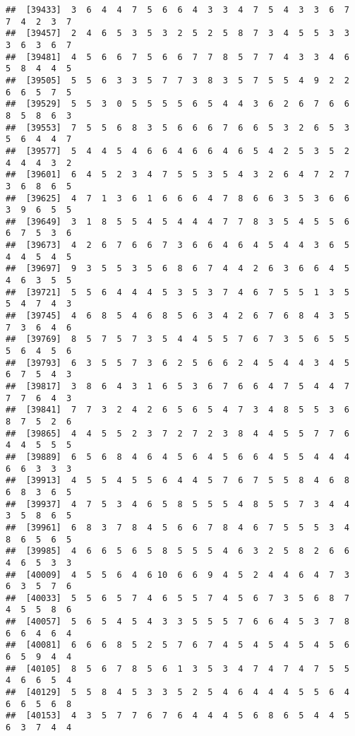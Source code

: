 \documentclass[
]{book}
\begin{document}
\begin{verbatim}
##  [39433]  3  6  4  4  7  5  6  6  4  3  3  4  7  5  4  3  3  6  7  7  4  2  3  7
##  [39457]  2  4  6  5  3  5  3  2  5  2  5  8  7  3  4  5  5  3  3  3  6  3  6  7
##  [39481]  4  5  6  6  7  5  6  6  7  7  8  5  7  7  4  3  3  4  6  5  8  4  4  5
##  [39505]  5  5  6  3  3  5  7  7  3  8  3  5  7  5  5  4  9  2  2  6  6  5  7  5
##  [39529]  5  5  3  0  5  5  5  5  6  5  4  4  3  6  2  6  7  6  6  8  5  8  6  3
##  [39553]  7  5  5  6  8  3  5  6  6  6  7  6  6  5  3  2  6  5  3  5  6  4  4  7
##  [39577]  5  4  4  5  4  6  6  4  6  6  4  6  5  4  2  5  3  5  2  4  4  4  3  2
##  [39601]  6  4  5  2  3  4  7  5  5  3  5  4  3  2  6  4  7  2  7  3  6  8  6  5
##  [39625]  4  7  1  3  6  1  6  6  6  4  7  8  6  6  3  5  3  6  6  3  9  6  5  5
##  [39649]  3  1  8  5  5  4  5  4  4  4  7  7  8  3  5  4  5  5  6  6  7  5  3  6
##  [39673]  4  2  6  7  6  6  7  3  6  6  4  6  4  5  4  4  3  6  5  4  4  5  4  5
##  [39697]  9  3  5  5  3  5  6  8  6  7  4  4  2  6  3  6  6  4  5  4  6  3  5  5
##  [39721]  5  5  6  4  4  4  5  3  5  3  7  4  6  7  5  5  1  3  5  5  4  7  4  3
##  [39745]  4  6  8  5  4  6  8  5  6  3  4  2  6  7  6  8  4  3  5  7  3  6  4  6
##  [39769]  8  5  7  5  7  3  5  4  4  5  5  7  6  7  3  5  6  5  5  5  6  4  5  6
##  [39793]  6  3  5  5  7  3  6  2  5  6  6  2  4  5  4  4  3  4  5  6  7  5  4  3
##  [39817]  3  8  6  4  3  1  6  5  3  6  7  6  6  4  7  5  4  4  7  7  7  6  4  3
##  [39841]  7  7  3  2  4  2  6  5  6  5  4  7  3  4  8  5  5  3  6  8  7  5  2  6
##  [39865]  4  4  5  5  2  3  7  2  7  2  3  8  4  4  5  5  7  7  6  4  4  5  5  5
##  [39889]  6  5  6  8  4  6  4  5  6  4  5  6  6  4  5  5  4  4  4  6  6  3  3  3
##  [39913]  4  5  5  4  5  5  6  4  4  5  7  6  7  5  5  8  4  6  8  6  8  3  6  5
##  [39937]  4  7  5  3  4  6  5  8  5  5  5  4  8  5  5  7  3  4  4  3  5  8  6  5
##  [39961]  6  8  3  7  8  4  5  6  6  7  8  4  6  7  5  5  5  3  4  8  6  5  6  5
##  [39985]  4  6  6  5  6  5  8  5  5  5  4  6  3  2  5  8  2  6  6  4  6  5  3  3
##  [40009]  4  5  5  6  4  6 10  6  6  9  4  5  2  4  4  6  4  7  3  6  3  5  7  6
##  [40033]  5  5  6  5  7  4  6  5  5  7  4  5  6  7  3  5  6  8  7  4  5  5  8  6
##  [40057]  5  6  5  4  5  4  3  3  5  5  5  7  6  6  4  5  3  7  8  6  6  4  6  4
##  [40081]  6  6  6  8  5  2  5  7  6  7  4  5  4  5  4  5  4  5  6  6  5  9  4  4
##  [40105]  8  5  6  7  8  5  6  1  3  5  3  4  7  4  7  4  7  5  5  4  6  6  5  4
##  [40129]  5  5  8  4  5  3  3  5  2  5  4  6  4  4  4  5  5  6  4  6  6  5  6  8
##  [40153]  4  3  5  7  7  6  7  6  4  4  4  5  6  8  6  5  4  4  5  6  3  7  4  4

\end{verbatim}
\end{document}
